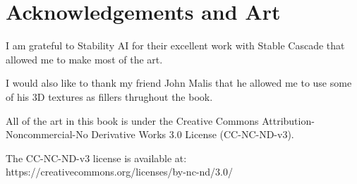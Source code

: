 \onecolumn
\chapter{Acknowledgements and Art}


\noindent I am grateful to Stability AI for their excellent work with Stable Cascade that allowed me to make most of the art.

\vspace{1em}

\noindent I would also like to thank my friend John Malis that he allowed me to use some of his 3D textures as fillers thrughout the book.

\vspace{1em}

\noindent All of the art in this book is under the Creative Commons Attribution-Noncommercial-No Derivative Works 3.0 License (CC-NC-ND-v3).

\vspace{1em}

\noindent The CC-NC-ND-v3 license is available at: https://creativecommons.org/licenses/by-nc-nd/3.0/

